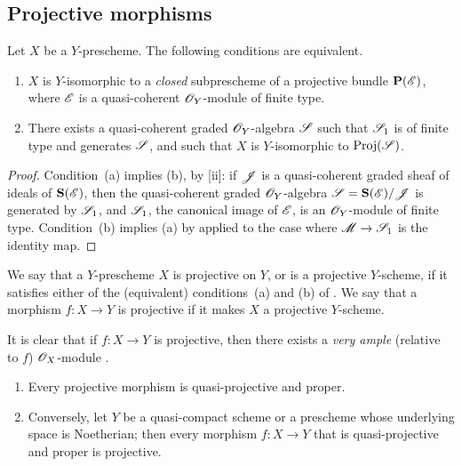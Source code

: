 \subsection{Projective morphisms}
\label{subsection:projective-morphisms}

\begin{prop}[5.5.1]
\label{2.5.5.1}
Let $X$ be a $Y$-prescheme.
The following conditions are equivalent.
\begin{enumerate}[label=\emph{(\alph*)}]
  \item $X$ is $Y$-isomorphic to a \emph{closed} subprescheme of a projective bundle $\mathbf{P}(\mathscr{E})$, where $\mathscr{E}$ is a quasi-coherent $\mathscr{O}_Y$-module of finite type.
  \item There exists a quasi-coherent graded $\mathscr{O}_Y$-algebra $\mathscr{S}$ such that $\mathscr{S}_1$ is of finite type and generates $\mathscr{S}$, and such that $X$ is $Y$-isomorphic to ${\mathop{\mathrm{Proj}}\nolimits}(\mathscr{S})$.
\end{enumerate}
\end{prop}

\begin{proof}
\label{proof-2.5.5.1}
Condition~(a) implies (b), by [ii]: if $\mathscr{J}$ is a quasi-coherent graded sheaf of ideals of $\mathbf{S}(\mathscr{E})$, then the quasi-coherent graded $\mathscr{O}_Y$-algebra $\mathscr{S}=\mathbf{S}(\mathscr{E})/\mathscr{J}$ is generated by $\mathscr{S}_1$, and $\mathscr{S}_1$, the canonical image of $\mathscr{E}$, is an $\mathscr{O}_Y$-module of finite type.
Condition~(b) implies (a) by  applied to the case where $\sh{M}\to\sh{S}_1$ is the identity map.
\end{proof}

\begin{defn}[5.5.2]
\label{2.5.5.2}
We say that a $Y$-prescheme $X$ is projective on $Y$, or is a projective $Y$-scheme, if it satisfies either of the (equivalent) conditions~(a) and (b) of .
We say that a morphism $f:X\to Y$ is projective if it makes $X$ a projective $Y$-scheme.
\end{defn}

It is clear that if $f:X\to Y$ is projective, then there exists a \emph{very ample} (relative to $f$) $\mathscr{O}_X$-module .

\begin{thm}[5.5.3]
\label{2.5.5.3}
\medskip\noindent
\begin{enumerate}[label=\emph{(\roman*)}]
  \item Every projective morphism is quasi-projective and proper.
  \item Conversely, let $Y$ be a quasi-compact scheme or a prescheme whose underlying space is Noetherian; then every morphism $f:X\to Y$ that is quasi-projective and proper is projective.
\end{enumerate}
\end{thm}

